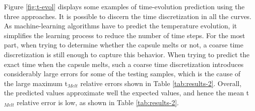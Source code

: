 Figure \ref{fig:t-evol} displays some examples of time-evolution prediction using the three approaches.
It is possible to discern the time discretization in all the curves.
As machine-learning algorithms have to predict the temperature evolution, it simplifies the learning process to reduce the number of time steps.
For the most part, when trying to determine whether the capsule melts or not, a coarse time discretization is still enough to capture this behavior.
When trying to predict the exact time when the capsule melts, such a coarse time discretization introduces considerably large errors for some of the testing samples, which is the cause of the large maximum t$_{Melt}$ relative errors shown in Table \ref{tab:results-2}.  
Overall, the predicted values approximate well the expected values, and hence the mean t$_{Melt}$ relative error is low, as shown in Table \ref{tab:results-2}.

